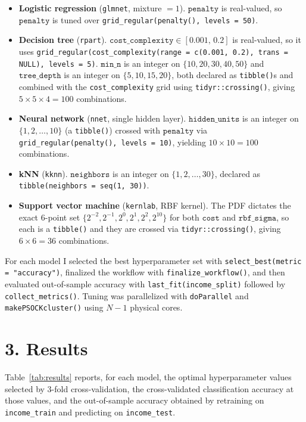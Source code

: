 \documentclass[11pt]{article}
\begin{document}
\begin{itemize}
\item \textbf{Logistic regression} (\texttt{glmnet}, mixture $=1$).
\(\texttt{penalty}\) is real-valued, so \(\texttt{penalty}\) is tuned over \texttt{grid\_regular(penalty(), levels = 50)}.

\item \textbf{Decision tree} (\texttt{rpart}).
\(\texttt{cost\_complexity} \in [0.001,\, 0.2]\) is real-valued, so it uses \texttt{grid\_regular(cost\_complexity(range = c(0.001, 0.2), trans = NULL), levels = 5)}.
\(\texttt{min\_n}\) is an integer on \(\{10, 20, 30, 40, 50\}\) and \(\texttt{tree\_depth}\) is an integer on \(\{5, 10, 15, 20\}\), both declared as \texttt{tibble()}s and combined with the \texttt{cost\_complexity} grid using \texttt{tidyr::crossing()}, giving \(5 \times 5 \times 4 = 100\) combinations.

\item \textbf{Neural network} (\texttt{nnet}, single hidden layer).
\(\texttt{hidden\_units}\) is an integer on \(\{1, 2, \ldots, 10\}\) (a \texttt{tibble()}) crossed with \(\texttt{penalty}\) via \texttt{grid\_regular(penalty(), levels = 10)}, yielding \(10 \times 10 = 100\) combinations.

\item \textbf{kNN} (\texttt{kknn}).
\(\texttt{neighbors}\) is an integer on \(\{1, 2, \ldots, 30\}\), declared as \texttt{tibble(neighbors = seq(1, 30))}.

\item \textbf{Support vector machine} (\texttt{kernlab}, RBF kernel).
The PDF dictates the exact 6-point set \(\{2^{-2}, 2^{-1}, 2^{0}, 2^{1}, 2^{2}, 2^{10}\}\) for both \(\texttt{cost}\) and \(\texttt{rbf\_sigma}\), so each is a \texttt{tibble()} and they are crossed via \texttt{tidyr::crossing()}, giving \(6 \times 6 = 36\) combinations.
\end{itemize}

For each model I selected the best hyperparameter set with \texttt{select\_best(metric = "accuracy")}, finalized the workflow with \texttt{finalize\_workflow()}, and then evaluated out-of-sample accuracy with \texttt{last\_fit(income\_split)} followed by \texttt{collect\_metrics()}.
Tuning was parallelized with \texttt{doParallel} and \texttt{makePSOCKcluster()} using \(N-1\) physical cores.

\section*{3. Results}
Table~\ref{tab:results} reports, for each model, the optimal hyperparameter values selected by 3-fold cross-validation, the cross-validated classification accuracy at those values, and the out-of-sample accuracy obtained by retraining on \texttt{income\_train} and predicting on \texttt{income\_test}.
\end{document}
